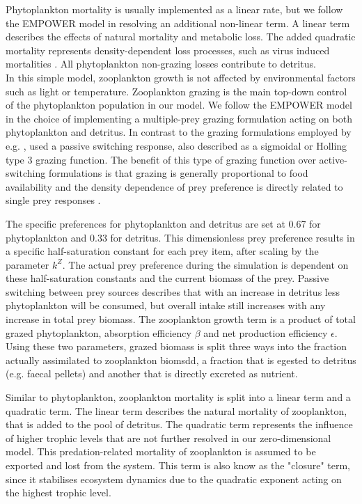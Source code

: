 \documentclass[template.tex]{subfiles}
\begin{document}
Phytoplankton mortality is usually implemented as a linear rate, but we follow the EMPOWER model in resolving an additional non-linear term. A linear term describes the effects of natural mortality and metabolic loss. The added quadratic mortality represents density-dependent loss processes, such as virus induced mortalities \citep{Anderson2015c}.  
All phytoplankton non-grazing losses contribute to detritus.\\




In this simple model, zooplankton growth is not affected by environmental factors such as light or temperature.
Zooplankton grazing is the main top-down control of the phytoplankton population in our model. We follow the EMPOWER model in the choice of implementing a multiple-prey grazing formulation acting on both phytoplankton and detritus. In contrast to the grazing formulations employed by e.g. \cite{Fasham1990a}, \citeauthor{Anderson2015c} used a passive switching response, also described as a sigmoidal or Holling type 3 grazing function. The benefit of this type of grazing function over active-switching formulations is that grazing is generally proportional to food availability and the density dependence of prey preference is directly related to single prey responses \citep{Gentleman2003a}.

The specific preferences for phytoplankton and detritus are set at 0.67 for phytoplankton and 0.33 for detritus. This dimensionless prey preference results in a specific half-saturation constant for each prey item, after scaling by the parameter $k^Z$. The actual prey preference during the simulation is dependent on these half-saturation constants and the current biomass of the prey. Passive switching between prey sources describes that with an increase in detritus less phytoplankton will be consumed, but overall intake still increases with any increase in total prey biomass. 
The zooplankton growth term is a product of total grazed phytoplankton, absorption efficiency $\beta$ and net production efficiency $\epsilon$. Using these two parameters, grazed biomass is split three ways into the fraction actually assimilated to zooplankton biomsdd, a fraction that is egested to detritus (e.g. faecal pellets) and another that is directly excreted as nutrient. 

Similar to phytoplankton, zooplankton mortality is split into a linear term and a quadratic term. The linear term describes the natural mortality of zooplankton, that is added to the pool of detritus. The quadratic term represents the influence of higher trophic levels that are not further resolved in our zero-dimensional model. This predation-related mortality of zooplankton is assumed to be exported and lost from the system.
This term is also know as the "closure" term, since it stabilises ecosystem dynamics due to the quadratic exponent acting on the highest trophic level.\\
\end{document}
